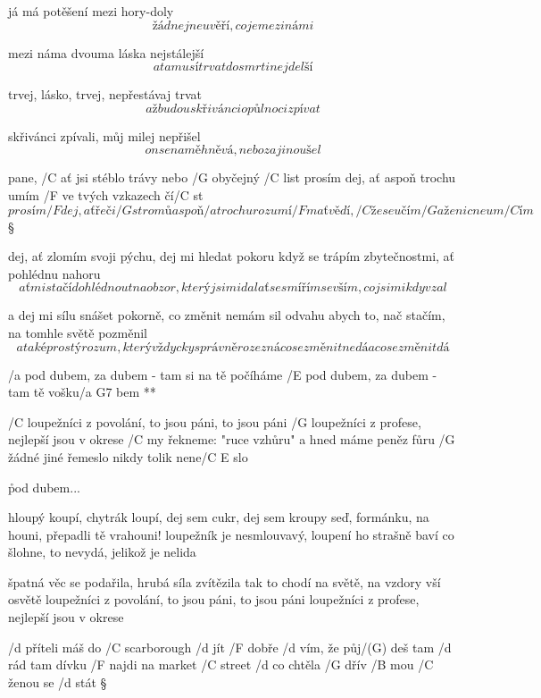 já má potěšení mezi hory-doly
\[ žádnej neuvěří, co je mezi námi \] \s

mezi náma dvouma láska nejstálejší
\[ a ta musí trvat do smrti nejdelší \] \s

trvej, lásko, trvej, nepřestávaj trvat
\[ až budou skřivánci o půlnoci zpívat \] \s

skřivánci zpívali, můj milej nepřišel
\[ on se na mě hněvá, nebo za jinou šel \]




pane, /C ať jsi stéblo trávy nebo /G obyčejný /C list
prosím dej, ať aspoň trochu umím /F ve tvých vzkazech čí/C st
\[ prosím /F dej, ať řeči /G stromů aspoň /a trochu rozumí/F m
ať vědí, /C že se učím /G a že nic neum/C ím \] \S

dej, ať zlomím svoji pýchu, dej mi hledat pokoru
když se trápím zbytečnostmi, ať pohlédnu nahoru
\[ ať mi stačí dohlédnout na obzor, který jsi mi dal
ať se smířím se vším, co jsi mi kdy vzal \] \s

a dej mi sílu snášet pokorně, co změnit nemám sil
odvahu abych to, nač stačím, na tomhle světě pozměnil
\[ a také prostý rozum, který vždycky správně rozezná
co se změnit nedá a co se změnit dá \]



\R  /a pod dubem, za dubem - tam si na tě počíháme
    /E pod dubem, za dubem - tam tě vošku/{a G7} bem **

/C loupežníci z povolání, to jsou páni, to jsou páni
/G loupežníci z profese, nejlepší jsou v okrese
/C my řekneme: "ruce vzhůru" a hned máme peněz fůru
/G žádné jiné řemeslo nikdy tolik nene/{C E} slo

\r pod dubem...

hloupý koupí, chytrák loupí, dej sem cukr, dej sem kroupy
seď, formánku, na houni, přepadli tě vrahouni!
loupežník je nesmlouvavý, loupení ho strašně baví
co šlohne, to nevydá, jelikož je nelida

\rr

špatná věc se podařila, hrubá síla zvítězila
tak to chodí na světě, na vzdory vší osvětě
loupežníci z povolání, to jsou páni, to jsou páni
loupežníci z profese, nejlepší jsou v okrese




/d příteli máš do /C scarborough /d jít
/F dobře /d vím, že půj/(G) deš tam /d rád
tam dívku /F najdi na market /C street
/d co chtěla /G dřív /B mou /C ženou se /d stát \S

